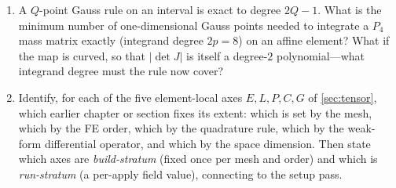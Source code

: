 \begin{enumerate}[nosep]
\item A $Q$-point Gauss rule on an interval is exact to degree $2Q-1$. What is the
  minimum number of one-dimensional Gauss points needed to integrate a $P_4$ mass
  matrix exactly (integrand degree $2p=8$) on an affine element? What if the map is
  curved, so that $|\det J|$ is itself a degree-$2$ polynomial---what integrand degree
  must the rule now cover?
\item Identify, for each of the five element-local axes $E,L,P,C,G$ of
  \cref{sec:tensor}, which earlier chapter or section fixes its extent: which is set
  by the mesh, which by the FE order, which by the quadrature rule, which by the
  weak-form differential operator, and which by the space dimension. Then state which
  axes are \emph{build-stratum} (fixed once per mesh and order) and which is
  \emph{run-stratum} (a per-apply field value), connecting to the
   setup pass.
\end{enumerate}
